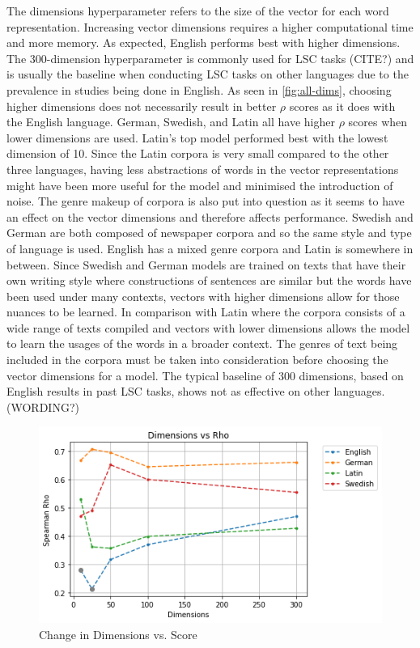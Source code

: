The dimensions hyperparameter refers to the size of the vector for each word representation. Increasing vector dimensions requires a higher computational time and more memory. As expected, English performs best with higher dimensions. The 300-dimension hyperparameter is commonly used for LSC tasks (CITE?) and is usually the baseline when conducting LSC tasks on other languages due to the prevalence in studies being done in English. As seen in \autoref{fig:all-dims}, choosing higher dimensions does not necessarily result in better $\rho$ scores as it does with the English language. German, Swedish, and Latin all have higher $\rho$ scores when lower dimensions are used. Latin’s top model performed best with the lowest dimension of 10. Since the Latin corpora is very small compared to the other three languages, having less abstractions of words in the vector representations might have been more useful for the model and minimised the introduction of noise. The genre makeup of corpora is also put into question as it seems to have an effect on the vector dimensions and therefore affects performance. Swedish and German are both composed of newspaper corpora and so the same style and type of language is used. English has a mixed genre corpora and Latin is somewhere in between. Since Swedish and German models are trained on texts that have their own writing style where constructions of sentences are similar but the words have been used under many contexts, vectors with higher dimensions allow for those nuances to be learned. In comparison with Latin where the corpora consists of a wide range of texts compiled and vectors with lower dimensions allows the model to learn the usages of the words in a broader context. The genres of text being included in the corpora must be taken into consideration before choosing the vector dimensions for a model. The typical baseline of 300 dimensions, based on English results in past LSC tasks, shows not as effective on other languages. (WORDING?)

\begin{figure}[h]
  \centering
  \includegraphics[width=.8\linewidth]{sections/figures/dims_all.png}
  \caption{Change in Dimensions vs. Score}
  \label{fig:all-dims}
\end{figure}

